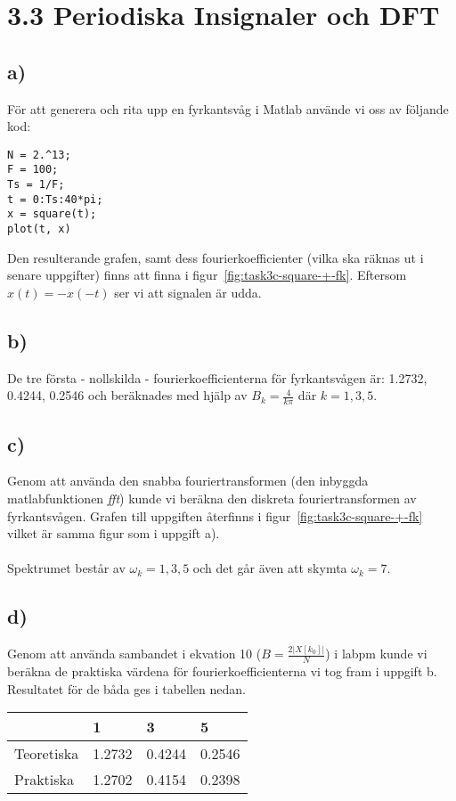 \section*{3.3 Periodiska Insignaler och DFT}
\subsection*{a)}
För att generera och rita upp en fyrkantsvåg i Matlab använde vi oss av
följande kod:

\begin{lstlisting}
N = 2.^13;
F = 100;
Ts = 1/F;
t = 0:Ts:40*pi;
x = square(t);
plot(t, x)
\end{lstlisting}

Den resulterande grafen, samt dess fourierkoefficienter (vilka ska räknas ut i
senare uppgifter) finns att finna i figur~\ref{fig:task3c-square-+-fk}.
Eftersom $x(t) = -x(-t)$ ser vi att signalen är udda.

\subsection*{b)}
De tre första - nollskilda - fourierkoefficienterna för fyrkantsvågen är: 
1.2732, 0.4244, 0.2546 och beräknades med hjälp av $B_k = \frac{4}{k\pi}$ där
$k=1,3,5$.

\subsection*{c)}
Genom att använda den snabba fouriertransformen (den inbyggda matlabfunktionen
\emph{fft}) kunde vi beräkna den diskreta fouriertransformen av fyrkantsvågen.
Grafen till uppgiften återfinns i figur~\ref{fig:task3c-square-+-fk} vilket är
samma figur som i uppgift a).\\\\
Spektrumet består av $\omega_k = 1, 3, 5$ och det går även att skymta $\omega_k =
7$.

\subsection*{d)}
Genom att använda sambandet i ekvation 10 ($B=\frac{2|X[k_0]|}{N}$) i labpm kunde
vi beräkna de praktiska värdena för fourierkoefficienterna vi tog fram i uppgift
b. Resultatet för de båda ges i tabellen nedan.

\begin{tabular}{| l | l | l | l |}
    \hline
     & 1 & 3 & 5 \\ \hline
    Teoretiska & 1.2732 & 0.4244 & 0.2546 \\ \hline
    Praktiska & 1.2702 & 0.4154 & 0.2398 \\ \hline
\end{tabular}

